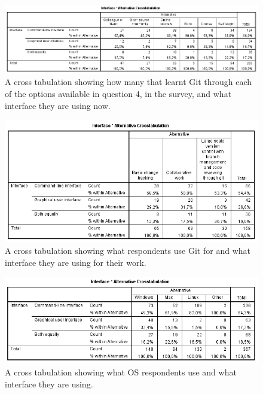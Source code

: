 \documentclass[a4paper,oneside]{bth} %
\begin{document}
		\begin{figure}[H]
			\centering
			\includegraphics[width=1\textwidth]{graphs/crosstabulation-learnt-using.png}
			\caption{A cross tabulation showing how many that learnt Git through each of the options available in question 4, in the survey, and what interface they are using now.}
			\label{fig:cross tabulation - what interface they are using x how they learnt Git}
		\end{figure}
		
		\begin{figure}[H]
			\centering
			\includegraphics[width=1\textwidth]{graphs/crosstabulation-how-using-git-interface.png}
			\caption{A cross tabulation showing what respondents use Git for and what interface they are using for their work.}
			\label{fig:cross tabulation - what interface they are using x what they use Git for.}
		\end{figure}
		
		\begin{figure}[H]
			\centering
			\includegraphics[width=1\textwidth]{graphs/crosstabulation-os-using.png}
			\caption{A cross tabulation showing what OS respondents use and what interface they are using.}
			\label{fig:cross tabulation - what interface they are using x what OS they use.}
		\end{figure}
		
\end{document}
